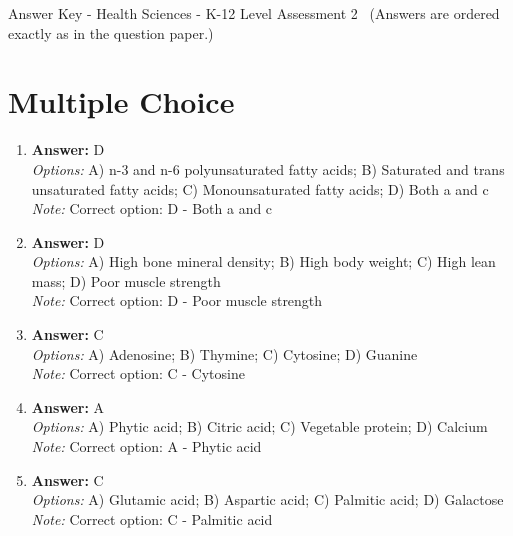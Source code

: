 \documentclass[12pt]{article}
\begin{document}
\begin{center}
Answer Key - Health Sciences - K-12 Level Assessment 2 \
\small (Answers are ordered exactly as in the question paper.)
\end{center}

\section*{Multiple Choice}
\begin{enumerate}[label=\arabic*.]
\item \textbf{Answer:} D
\\ \textit{Options:} A) n-3 and n-6 polyunsaturated fatty acids; B) Saturated and trans unsaturated fatty acids; C) Monounsaturated fatty acids; D) Both a and c
\\ \textit{Note:} Correct option: D - Both a and c
\item \textbf{Answer:} D
\\ \textit{Options:} A) High bone mineral density; B) High body weight; C) High lean mass; D) Poor muscle strength
\\ \textit{Note:} Correct option: D - Poor muscle strength
\item \textbf{Answer:} C
\\ \textit{Options:} A) Adenosine; B) Thymine; C) Cytosine; D) Guanine
\\ \textit{Note:} Correct option: C - Cytosine
\item \textbf{Answer:} A
\\ \textit{Options:} A) Phytic acid; B) Citric acid; C) Vegetable protein; D) Calcium
\\ \textit{Note:} Correct option: A - Phytic acid
\item \textbf{Answer:} C
\\ \textit{Options:} A) Glutamic acid; B) Aspartic acid; C) Palmitic acid; D) Galactose
\\ \textit{Note:} Correct option: C - Palmitic acid
\end{enumerate}
\end{document}
